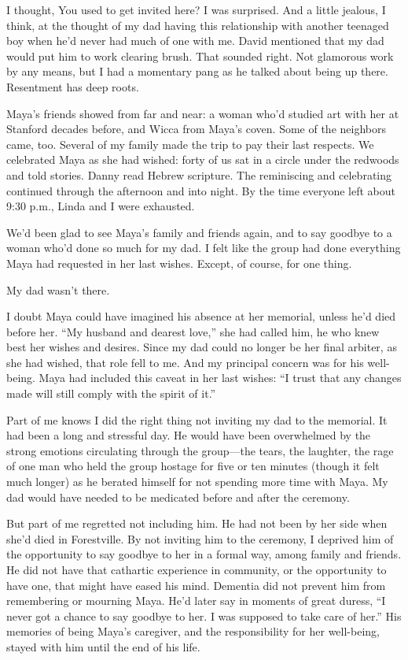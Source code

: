 \documentclass[12pt]{book}
\begin{document}
I thought, You used to get invited here? I was surprised. And a little jealous, I think, at the thought of my dad having this relationship with another teenaged boy when he'd never had much of one with me. David mentioned that my dad would put him to work clearing brush. That sounded right. Not glamorous work by any means, but I had a momentary pang as he talked about being up there. Resentment has deep roots.

Maya's friends showed from far and near: a woman who'd studied art with her at Stanford decades before, and Wicca from Maya's coven. Some of the neighbors came, too. Several of my family made the trip to pay their last respects. We celebrated Maya as she had wished: forty of us sat in a circle under the redwoods and told stories. Danny read Hebrew scripture. The reminiscing and celebrating continued through the afternoon and into night. By the time everyone left about 9:30 p.m., Linda and I were exhausted.

We'd been glad to see Maya's family and friends again, and to say goodbye to a woman who'd done so much for my dad. I felt like the group had done everything Maya had requested in her last wishes. Except, of course, for one thing.

My dad wasn't there.

I doubt Maya could have imagined his absence at her memorial, unless he'd died before her. ``My husband and dearest love,'' she had called him, he who knew best her wishes and desires. Since my dad could no longer be her final arbiter, as she had wished, that role fell to me. And my principal concern was for his well-being. Maya had included this caveat in her last wishes: ``I trust that any changes made will still comply with the spirit of it.''

Part of me knows I did the right thing not inviting my dad to the memorial. It had been a long and stressful day. He would have been overwhelmed by the strong emotions circulating through the group---the tears, the laughter, the rage of one man who held the group hostage for five or ten minutes (though it felt much longer) as he berated himself for not spending more time with Maya. My dad would have needed to be medicated before and after the ceremony.

But part of me regretted not including him. He had not been by her side when she'd died in Forestville. By not inviting him to the ceremony, I deprived him of the opportunity to say goodbye to her in a formal way, among family and friends. He did not have that cathartic experience in community, or the opportunity to have one, that might have eased his mind. Dementia did not prevent him from remembering or mourning Maya. He'd later say in moments of great duress, ``I never got a chance to say goodbye to her. I was supposed to take care of her.'' His memories of being Maya's caregiver, and the responsibility for her well-being, stayed with him until the end of his life. 
\end{document}
